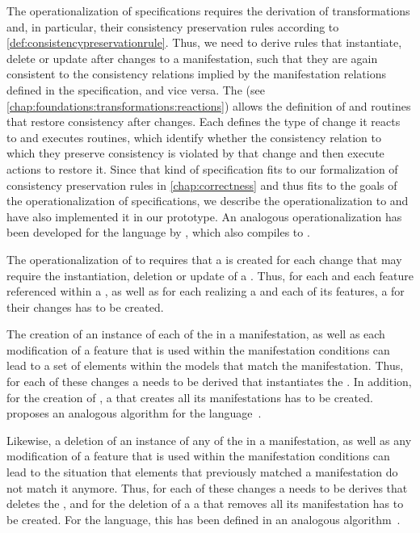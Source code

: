The operationalization of \commonalities specifications requires the derivation of transformations and, in particular, their consistency preservation rules according to \autoref{def:consistencypreservationrule}.
Thus, we need to derive rules that instantiate, delete or update \commonalities after changes to a manifestation, such that they are again consistent to the consistency relations implied by the manifestation relations defined in the \commonalities specification, and vice versa.
The \reactionslanguage (see \autoref{chap:foundations:transformations:reactions}) allows the definition of \reactions and routines that restore consistency after changes.
Each \reaction defines the type of change it reacts to and executes routines, which identify whether the consistency relation to which they preserve consistency is violated by that change and then execute actions to restore it.
Since that kind of specification fits to our formalization of consistency preservation rules in \autoref{chap:correctness} and thus fits to the goals of the operationalization of \commonalities specifications, we describe the operationalization to \reactions and have also implemented it in our prototype.
An analogous operationalization has been developed for the \mappings language by \textcite[Sec. 7.7]{kramer2017a}, which also compiles to \reactions.

The operationalization of \commonalities to \reactions requires that a \reaction is created for each change that may require the instantiation, deletion or update of a \commonality.
Thus, for each \metaclass and each feature referenced within a \commonality, as well as for each \metaclass realizing a \commonality and each of its features, a \reaction for their changes has to be created.

The creation of an instance of each of the \metaclasses in a manifestation, as well as each modification of a feature that is used within the manifestation conditions can lead to a set of elements within the models that match the manifestation.
Thus, for each of these changes a \reaction needs to be derived that instantiates the \commonality.
In addition, for the creation of \commonality, a \reaction that creates all its manifestations has to be created.
\citeauthor{kramer2017a} proposes an analogous algorithm for the \mappings language~\cite[Alg. 1]{kramer2017a}.

Likewise, a deletion of an instance of any of the \metaclasses in a manifestation, as well as any modification of a feature that is used within the manifestation conditions can lead to the situation that elements that previously matched a manifestation do not match it anymore.
Thus, for each of these changes a \reaction needs to be derives that deletes the \commonality, and for the deletion of a \commonality a \reaction that removes all its manifestation has to be created.
For the \mappings language, this has been defined in an analogous algorithm~\cite[Alg. 2]{kramer2017a}.

